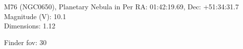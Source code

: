 \begin{block}{M76 (NGC0650), Planetary Nebula in Per}
    RA: 01:42:19.69, Dec: +51:34:31.7 \\ 
    Magnitude (V): 10.1 \\ 
    Dimensions: 1.12 

    Finder fov: 30 
\end{block}